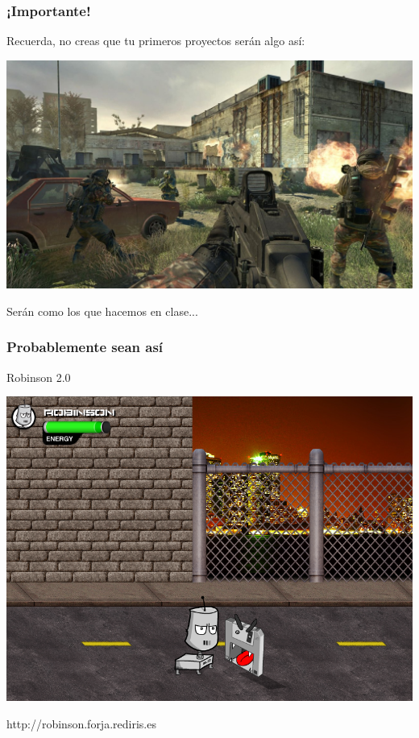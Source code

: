 \begin{frame}
	\frametitle{¡Importante!}
	
	\begin{center}
		Recuerda, no creas que tu primeros proyectos serán algo así:
	\end{center}	
	
	\begin{center}
		\includegraphics[scale=0.2]{img/codmw2.jpg}
	\end{center}
	
	\begin{center}
		Serán como los que hacemos en clase...
	\end{center}	
\end{frame}


\begin{frame}
	\frametitle{Probablemente sean así}

	\begin{center}
	Robinson 2.0
	
	    \includegraphics[scale=0.26]{img/robinson.png}
	    
	http://robinson.forja.rediris.es
	\end{center}
\end{frame}

